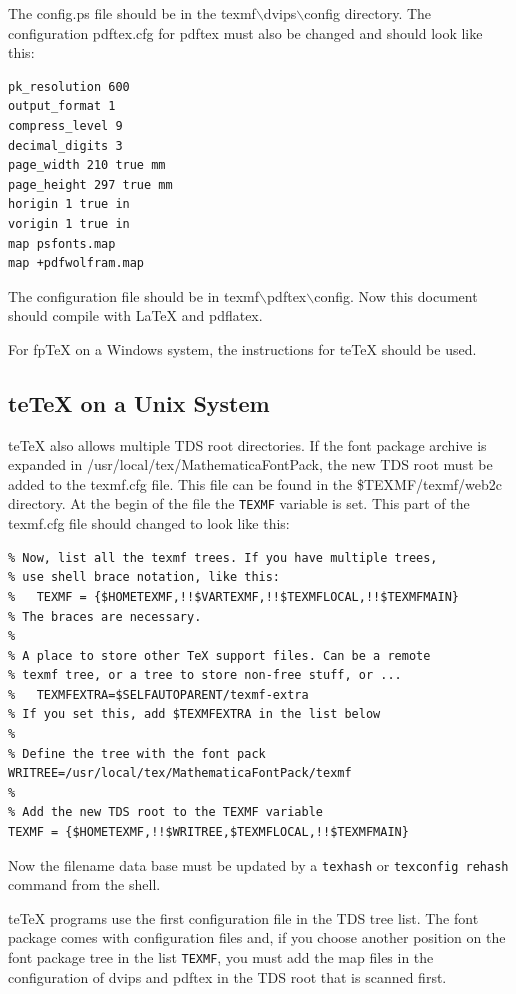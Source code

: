 \documentclass{article}
\newcommand{\teTeX}{\textsf{te\TeX}\xspace}
\begin{document}
\noindent{}The \textsf{config.ps} file should be in the 
\textsf{texmf$\backslash$dvips$\backslash$config}
directory.
The configuration  \textsf{pdftex.cfg} for 
\textsf{pdftex} must also be changed and should 
look like this:
\begin{verbatim}
pk_resolution 600
output_format 1
compress_level 9
decimal_digits 3
page_width 210 true mm
page_height 297 true mm
horigin 1 true in
vorigin 1 true in
map psfonts.map
map +pdfwolfram.map
\end{verbatim}

\noindent{}The configuration file should be in
\textsf{texmf$\backslash$pdftex$\backslash$config}.  Now this document
should compile with \LaTeX{} and \textsf{pdflatex}.

For \textsf{fpTeX} on a Windows system, the instructions for \teTeX
should be used.


\subsection{\teTeX on a Unix System}

\teTeX also allows multiple TDS root directories. If the font package
archive is expanded in \textsf{/usr/local/tex/MathematicaFontPack},
the new TDS root must be added to the \textsf{texmf.cfg} file. This
file can be found in the \textsf{\$TEXMF/texmf/web2c} directory. At
the begin of the file the \texttt{TEXMF} variable is set. This part of
the \textsf{texmf.cfg} file should changed to look like this:
\begin{verbatim}
% Now, list all the texmf trees. If you have multiple trees,
% use shell brace notation, like this:
%   TEXMF = {$HOMETEXMF,!!$VARTEXMF,!!$TEXMFLOCAL,!!$TEXMFMAIN}
% The braces are necessary.
%
% A place to store other TeX support files. Can be a remote
% texmf tree, or a tree to store non-free stuff, or ...
%   TEXMFEXTRA=$SELFAUTOPARENT/texmf-extra
% If you set this, add $TEXMFEXTRA in the list below
%
% Define the tree with the font pack
WRITREE=/usr/local/tex/MathematicaFontPack/texmf
%
% Add the new TDS root to the TEXMF variable
TEXMF = {$HOMETEXMF,!!$WRITREE,$TEXMFLOCAL,!!$TEXMFMAIN}
\end{verbatim}
Now the filename data base must be updated by a \texttt{texhash} or
\texttt{texconfig rehash} command from the shell.

\teTeX programs use the first configuration file in the TDS tree
list. The font package comes with configuration files and, if you
choose another position on the font package tree in the list
\texttt{TEXMF}, you must add the map files in the configuration of
\textsf{dvips} and \textsf{pdftex} in the TDS root that is scanned
first.
\end{document}

